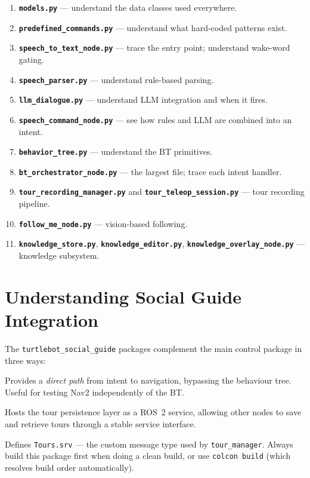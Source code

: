 \documentclass[12pt,a4paper]{report}
\newcommand{\pkg}[1]{\texttt{\color{RoyalBlue}#1}}
\newcommand{\file}[1]{\texttt{\color{black!70}#1}}
\begin{document}
\begin{enumerate}[leftmargin=2em]
  \item \textbf{\file{models.py}} — understand the data classes used everywhere.
  \item \textbf{\file{predefined\_commands.py}} — understand what hard-coded
        patterns exist.
  \item \textbf{\file{speech\_to\_text\_node.py}} — trace the entry point;
        understand wake-word gating.
  \item \textbf{\file{speech\_parser.py}} — understand rule-based parsing.
  \item \textbf{\file{llm\_dialogue.py}} — understand LLM integration and when
        it fires.
  \item \textbf{\file{speech\_command\_node.py}} — see how rules and LLM are
        combined into an intent.
  \item \textbf{\file{behavior\_tree.py}} — understand the BT primitives.
  \item \textbf{\file{bt\_orchestrator\_node.py}} — the largest file; trace
        each intent handler.
  \item \textbf{\file{tour\_recording\_manager.py}} and
        \textbf{\file{tour\_teleop\_session.py}} — tour recording pipeline.
  \item \textbf{\file{follow\_me\_node.py}} — vision-based following.
  \item \textbf{\file{knowledge\_store.py}},
        \textbf{\file{knowledge\_editor.py}},
        \textbf{\file{knowledge\_overlay\_node.py}} — knowledge subsystem.
\end{enumerate}

\section{Understanding Social Guide Integration}

The \pkg{turtlebot\_social\_guide} packages complement the main control
package in three ways:

\begin{description}[leftmargin=2em, style=nextline]
  \item[\pkg{speech\_locomotion\_interface}]
    Provides a \emph{direct path} from intent to navigation, bypassing the
    behaviour tree.  Useful for testing Nav2 independently of the BT.

  \item[\pkg{tour\_manager}]
    Hosts the tour persistence layer as a ROS~2 service, allowing other nodes
    to save and retrieve tours through a stable service interface.

  \item[\pkg{social\_robot\_interfaces}]
    Defines \texttt{Tours.srv} — the custom message type used by
    \pkg{tour\_manager}.  Always build this package first when doing a clean
    build, or use \texttt{colcon build} (which resolves build order
    automatically).
\end{description}
\end{document}
